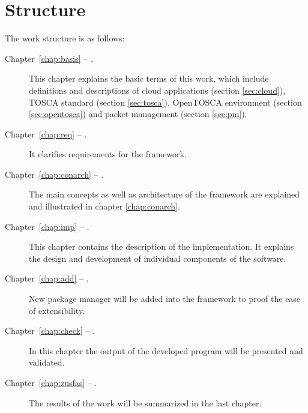 \section*{Structure}
The work structure is as follows:
\begin{description}
\item[Chapter~\ref{chap:basis} -- .] This chapter explains the basic terms of this work, which include definitions and descriptions of cloud applications (section \ref{sec:cloud}), TOSCA standard (section \ref{sec:tosca}), OpenTOSCA environment  (section \ref{sec:opentosca}) and packet management (section \ref{sec:pm}).
\item[Chapter~\ref{chap:req} -- .] It clarifies requirements for the framework.
\item[Chapter~\ref{chap:conarch} -- .] The main concepts as well as architecture of the framework are explained and illustrated in chapter \ref{chap:conarch}.
\item[Chapter~\ref{chap:imp} -- .] This chapter contains the description of the implementation.
 It explains the design and development of individual components of the software. 
\item[Chapter~\ref{chap:add} -- .] New package manager will be added into the framework to proof the ease of extensibility. 
\item[Chapter~\ref{chap:check} -- .] In this chapter the output of the developed program will be presented and validated.
\item[Chapter~\ref{chap:zusfas} -- .] The results of the work will be summarized in the last chapter.
\end{description}
